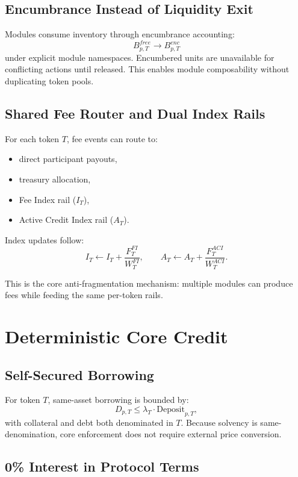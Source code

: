 \documentclass[version=preprint]{iacrcc}
\begin{document}
\subsection{Encumbrance Instead of Liquidity Exit}

Modules consume inventory through encumbrance accounting:
\[
B^{free}_{p,T} \rightarrow B^{enc}_{p,T}
\]
under explicit module namespaces. Encumbered units are unavailable for conflicting actions until released. This enables module composability without duplicating token pools.

\subsection{Shared Fee Router and Dual Index Rails}

For each token $T$, fee events can route to:
\begin{itemize}
  \item direct participant payouts,
  \item treasury allocation,
  \item Fee Index rail ($I_T$),
  \item Active Credit Index rail ($A_T$).
\end{itemize}

Index updates follow:
\[
I_T \leftarrow I_T + \frac{F^{FI}_T}{W^{FI}_T}, \qquad
A_T \leftarrow A_T + \frac{F^{ACI}_T}{W^{ACI}_T}.
\]

This is the core anti-fragmentation mechanism: multiple modules can produce fees while feeding the same per-token rails.

\section{Deterministic Core Credit}

\subsection{Self-Secured Borrowing}

For token $T$, same-asset borrowing is bounded by:
\[
D_{p,T} \le \lambda_T \cdot \text{Deposit}_{p,T},
\]
with collateral and debt both denominated in $T$. Because solvency is same-denomination, core enforcement does not require external price conversion.

\subsection{0\% Interest in Protocol Terms}
\end{document}
